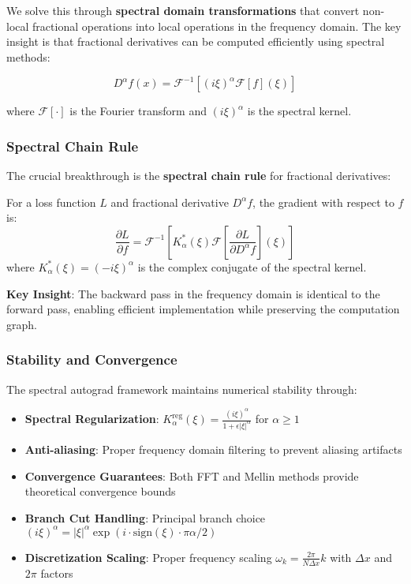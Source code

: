 We solve this through \textbf{spectral domain transformations} that convert non-local fractional operations into local operations in the frequency domain. The key insight is that fractional derivatives can be computed efficiently using spectral methods:

\begin{equation}
D^{\alpha} f(x) = \mathcal{F}^{-1}[(i\xi)^{\alpha} \mathcal{F}[f](\xi)]
\end{equation}

where $\mathcal{F}[\cdot]$ is the Fourier transform and $(i\xi)^{\alpha}$ is the spectral kernel.

\subsubsection{Spectral Chain Rule}

The crucial breakthrough is the \textbf{spectral chain rule} for fractional derivatives:

\begin{theorem}
For a loss function $L$ and fractional derivative $D^{\alpha} f$, the gradient with respect to $f$ is:
\begin{equation}
\frac{\partial L}{\partial f} = \mathcal{F}^{-1}\left[K_{\alpha}^*(\xi) \mathcal{F}\left[\frac{\partial L}{\partial D^{\alpha} f}\right](\xi)\right]
\end{equation}
where $K_{\alpha}^*(\xi) = (-i\xi)^{\alpha}$ is the complex conjugate of the spectral kernel.
\end{theorem}

\textbf{Key Insight}: The backward pass in the frequency domain is identical to the forward pass, enabling efficient implementation while preserving the computation graph.

\subsubsection{Stability and Convergence}

The spectral autograd framework maintains numerical stability through:

\begin{itemize}
    \item \textbf{Spectral Regularization}: $K_{\alpha}^{\text{reg}}(\xi) = \frac{(i\xi)^{\alpha}}{1 + \epsilon|\xi|^{\alpha}}$ for $\alpha \geq 1$
    \item \textbf{Anti-aliasing}: Proper frequency domain filtering to prevent aliasing artifacts
    \item \textbf{Convergence Guarantees}: Both FFT and Mellin methods provide theoretical convergence bounds
    \item \textbf{Branch Cut Handling}: Principal branch choice $(i\xi)^{\alpha} = |\xi|^{\alpha} \exp(i \cdot \text{sign}(\xi) \cdot \pi \alpha / 2)$
    \item \textbf{Discretization Scaling}: Proper frequency scaling $\omega_k = \frac{2\pi}{N\Delta x} k$ with $\Delta x$ and $2\pi$ factors
\end{itemize}

